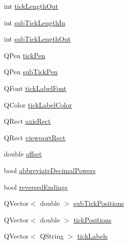 \begin{DoxyCompactItemize}
\item 
int \hyperlink{class_q_c_p_axis_painter_private_acbebb1f868906200f968627bc907b77d}{tick\+Length\+Out}
\item 
int \hyperlink{class_q_c_p_axis_painter_private_af11f7d83021c9cb3b0e76fe7814c6110}{sub\+Tick\+Length\+In}
\item 
int \hyperlink{class_q_c_p_axis_painter_private_a5f1afddc3dc7ccc4d5adcbcd8f0c2218}{sub\+Tick\+Length\+Out}
\item 
Q\+Pen \hyperlink{class_q_c_p_axis_painter_private_a389dde97f02fdee23965e4736e7d8c62}{tick\+Pen}
\item 
Q\+Pen \hyperlink{class_q_c_p_axis_painter_private_a9b9cf594cd16575f52ecda9abef4e412}{sub\+Tick\+Pen}
\item 
Q\+Font \hyperlink{class_q_c_p_axis_painter_private_a06cb4b185feb1e560e01d65887e4d80d}{tick\+Label\+Font}
\item 
Q\+Color \hyperlink{class_q_c_p_axis_painter_private_a88032cf15c997e3956b79617b859e8ad}{tick\+Label\+Color}
\item 
Q\+Rect \hyperlink{class_q_c_p_axis_painter_private_afcd55b0e1ecd689fffd2b1fc75dc7732}{axis\+Rect}
\item 
Q\+Rect \hyperlink{class_q_c_p_axis_painter_private_a8627dc6b40781e3291bb508e4ac574d6}{viewport\+Rect}
\item 
double \hyperlink{class_q_c_p_axis_painter_private_aea226a1e39357d71f66d85093e30a830}{offset}
\item 
bool \hyperlink{class_q_c_p_axis_painter_private_a68353c2eeabd00d96a2e36a0b3809cb2}{abbreviate\+Decimal\+Powers}
\item 
bool \hyperlink{class_q_c_p_axis_painter_private_a06d0ef3f4f1b567feb84196fc3b140da}{reversed\+Endings}
\item 
Q\+Vector$<$ double $>$ \hyperlink{class_q_c_p_axis_painter_private_afcde7484bbcc1004b8f59ab984ada6f9}{sub\+Tick\+Positions}
\item 
Q\+Vector$<$ double $>$ \hyperlink{class_q_c_p_axis_painter_private_ae55e3dc2cf2af8d8a6e7235ccab54786}{tick\+Positions}
\item 
Q\+Vector$<$ Q\+String $>$ \hyperlink{class_q_c_p_axis_painter_private_ad0a4998ca358ba751e84fca45a025abd}{tick\+Labels}
\end{DoxyCompactItemize}
